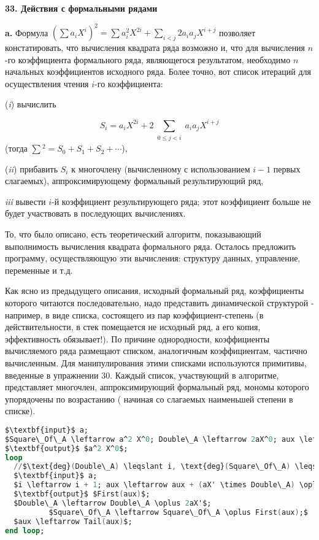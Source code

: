 \noindent\textbf{33. Действия с формальными рядами}\newline

\textbf{a.} Формула $(\sum a_iX^i)^2 = \sum a_i^2 X^{2i} + \sum_{i < j}2a_i a_j X^{i+j}$ позволяет констатировать,
что вычисления квадрата ряда возможно и, что для вычисления $n$-го коэффициента
формального ряда, являющегося результатом, необходимо $n$ начальных коэффициентов исходного ряда. Более точно, вот список итераций для осуществления чтения $i$-го коэффициента:

(\textit{i}) вычислить

\begin{equation*}
S_i = a_i X^{2i} + 2 \sum_{\substack{0 \leqslant j < i}} a_i a_j X^{i+j}
\end{equation*}
(тогда \small{$\sum$}$^2 = S_0 + S_1 + S_2 + \cdots$),

(\textit{ii}) прибавить $S_i$ к многочлену (вычисленному с использованием $i - 1$ первых слагаемых),
аппроксимирующему формальный результирующий ряд,

\textit{iii} вывести $i$-й коэффициент результирующего ряда; этот коэффициент
больше не будет участвовать в последующих вычислениях.

То, что было описано, есть теоретический алгоритм, показывающий выполнимость
вычисления квадрата формального ряда. Осталось предложить программу,
осуществляющую эти вычисления: структуру данных, управление, переменные и т.д.

Как ясно из предыдущего описания, исходный формальный ряд, коэффициенты которого
читаются последовательно, надо представить динамической структурой - например,
в виде списка, состоящего из пар коэффициент-степень (в действительности,
в стек помещается не исходный ряд, а его копия, эффективность обязывает!).
По причине однородности, коэффициенты вычисляемого ряда размещают списком,
аналогичным коэффициентам, частично вычисленным. Для манипулирования этими
списками используются примитивы, введенные в упражнении 30. Каждый список,
участвующий в алгоритме, представляет многочлен, аппроксимирующий формальный ряд, мономы которого
упорядочены по возрастанию ( начиная со слагаемых наименьшей степени в списке).
\newpage

\begin{lstlisting}[mathescape=true, caption=Квадрат формального ряда, language=Ada]
$\textbf{input}$ a;
$Square\_Of\_A \leftarrow a^2 X^0; Double\_A \leftarrow 2aX^0; aux \leftarrow 0; i \leftarrow 0;$
$\textbf{output}$ $a^2 X^0$;
loop
  //$\text{deg}(Double\_A) \leqslant i, \text{deg}(Square\_Of\_A) \leqslant i, \text{deg}(aux) \leqslant 2i, \text{ord}(aux) \geqslant i$
  $\textbf{input}$ a;
  $i \leftarrow i + 1; aux \leftarrow aux + (aX' \times Double\_A) \oplus a^2 X^{2i}$;
  $\textbf{output}$ $First(aux)$;
  $Double\_A \leftarrow Double\_A \oplus 2aX'$;
          $Square\_Of\_A \leftarrow Square\_Of\_A \oplus First(aux);$
  $aux \leftarrow Tail(aux)$;
end loop;
\end{lstlisting}

